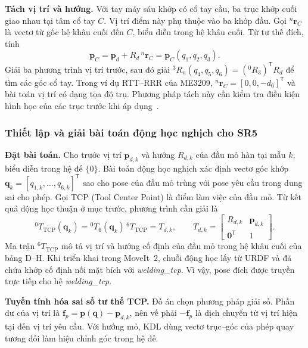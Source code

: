\medskip
\noindent\textbf{Tách vị trí và hướng.}
Với tay máy sáu khớp có cổ tay cầu, ba trục khớp cuối giao nhau tại tâm cổ tay \(C\). Vị trí điểm này phụ thuộc vào ba khớp đầu. Gọi \({}^{n}\mathbf r_C\) là vectơ từ gốc hệ khâu cuối đến \(C\), biểu diễn trong hệ khâu cuối. Từ tư thế đích, tính
\[
 \mathbf p_C=\mathbf p_d+R_d\,{}^{n}\mathbf r_C
             =\mathbf p_C(q_1,q_2,q_3).
\]
Giải ba phương trình vị trí trước, sau đó giải \({}^3 R_n(q_4,q_5,q_6)=({}^0R_3)^{\mathsf T}R_d\) để tìm các góc cổ tay. Trong ví dụ RTT--RRR của ME3209, \({}^{n}\mathbf r_C=[0,0,-d_6]^{\mathsf T}\) và bài toán vị trí có dạng tọa độ trụ. Phương pháp tách này cần kiểm tra điều kiện hình học của các trục trước khi áp dụng~\cite[mục 3.2.5, tr.~73--75]{me3209}.

\subsubsection*{Thiết lập và giải bài toán động học nghịch cho SR5}
\noindent\textbf{Đặt bài toán.}
Cho trước vị trí \(\mathbf p_{d,k}\) và hướng \(R_{d,k}\) của đầu mỏ hàn tại mẫu \(k\), biểu diễn trong hệ đế \(\{0\}\). Bài toán động học nghịch xác định vectơ góc khớp \(\mathbf q_k=[q_{1,k},\ldots,q_{6,k}]^{\mathsf T}\) sao cho pose của đầu mỏ trùng với pose yêu cầu trong dung sai cho phép. Gọi TCP (Tool Center Point) là điểm làm việc của đầu mỏ. Từ kết quả động học thuận ở mục trước, phương trình cần giải là
\begin{equation}
  {}^0T_{\mathrm{TCP}}(\mathbf q_k)
    = {}^0T_6(\mathbf q_k)\,{}^6T_{\mathrm{TCP}}
    = T_{d,k}, \qquad
  T_{d,k} =
    \begin{bmatrix}
      R_{d,k} & \mathbf p_{d,k}\\
      \mathbf 0^{\mathsf T} & 1
    \end{bmatrix}.
  \label{eq:sr5-ik-pose}
\end{equation}
Ma trận \({}^6T_{\mathrm{TCP}}\) mô tả vị trí và hướng cố định của đầu mỏ trong hệ khâu cuối của bảng D--H. Khi triển khai trong MoveIt~2, chuỗi động học lấy từ URDF và đã chứa khớp cố định nối mặt bích với \textit{welding\_tcp}. Vì vậy, pose đích được truyền trực tiếp cho hệ \textit{welding\_tcp}.

\noindent\textbf{Tuyến tính hóa sai số tư thế TCP.}
Đồ án chọn phương pháp giải số. Phần dư của vị trí là \(\mathbf f_p=\mathbf p(\mathbf q)-\mathbf p_{d,k}\), nên vế phải \(-\mathbf f_p\) là dịch chuyển từ vị trí hiện tại đến vị trí yêu cầu. Với hướng mỏ, KDL dùng vectơ trục--góc của phép quay tương đối làm hiệu chỉnh góc trong hệ đế.

